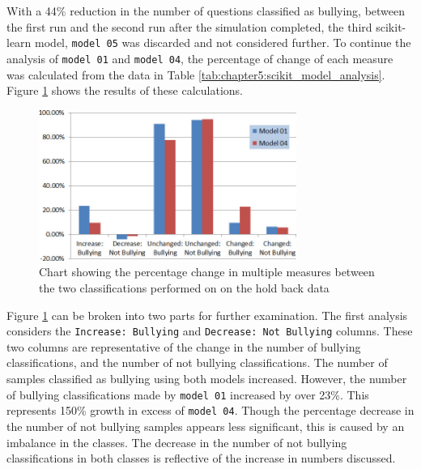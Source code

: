 With a 44\% reduction in the number of questions classified as bullying, between the first run and the second run after the simulation completed, the third scikit-learn model, \verb|model 05| was discarded and not considered further. To continue the analysis of \verb|model 01| and \verb|model 04|, the percentage of change of each measure was calculated from the data in Table \ref{tab:chapter5:scikit_model_analysis}. Figure \ref{fig:scikit_analysis_01} shows the results of these calculations.

\begin{figure}[htbp]
	\centering
	\includegraphics[width=0.75\textwidth]{Figures/Chapter5/scikit_analysis_01.jpg}
	\caption[Percentage change in hold back dataset classification]{Chart showing the percentage change in multiple measures between the two classifications performed on on the hold back data}
	\label{fig:scikit_analysis_01}
\end{figure}

Figure \ref{fig:scikit_analysis_01} can be broken into two parts for further examination. The first analysis considers the \verb|Increase: Bullying| and \verb|Decrease: Not Bullying| columns. These two columns are representative of the change in the number of bullying classifications, and the number of not bullying classifications. The number of samples classified as bullying using both models increased. However, the number of bullying classifications made by \verb|model 01| increased by over 23\%. This represents 150\% growth in excess of \verb|model 04|. Though the percentage decrease in the number of not bullying samples appears less significant, this is caused by an imbalance in the classes. The decrease in the number of not bullying classifications in both classes is reflective of the increase in numbers discussed.


